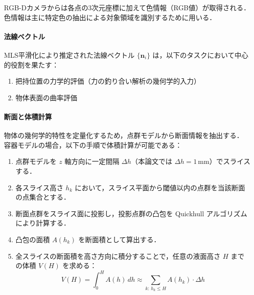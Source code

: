 RGB-Dカメラからは各点の3次元座標に加えて色情報（RGB値）が取得される．
色情報は主に特定色の抽出による対象領域を識別するために用いる．

\paragraph{法線ベクトル}

MLS平滑化により推定された法線ベクトル $\{ \bm{n}_i \}$ は，以下のタスクにおいて中心的役割を果たす：

\begin{enumerate}
  \item 把持位置の力学的評価（力の釣り合い解析の幾何学的入力）
  \item 物体表面の曲率評価
\end{enumerate}


\paragraph{断面と体積計算}

物体の幾何学的特性を定量化するため，点群モデルから断面情報を抽出する．
容器モデルの場合，以下の手順で体積計算が可能である：

\begin{enumerate}
  \item 点群モデルを $z$ 軸方向に一定間隔 $\Delta h$（本論文では $\Delta h = 1$\,mm）でスライスする．
  \item 各スライス高さ $h_k$ において，スライス平面から閾値以内の点群を当該断面の点集合とする．
  \item 断面点群をスライス面に投影し，投影点群の凸包を Quickhull アルゴリズム\cite{PCL-Convex}により計算する．
  \item 凸包の面積 $A(h_k)$ を断面積として算出する．
  \item 全スライスの断面積を高さ方向に積分することで，任意の液面高さ $H$ までの体積 $V(H)$ を求める：
  \begin{equation}
    V(H) = \int_{0}^{H} A(h)\, dh \approx \sum_{k:\,h_k \leq H} A(h_k) \cdot \Delta h
    \label{eq:system:volume_integral}
  \end{equation}
\end{enumerate}


